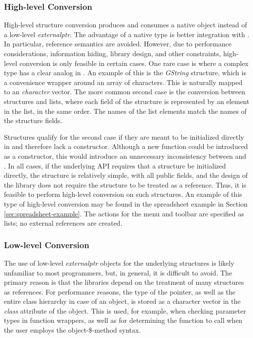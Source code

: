 \documentclass[article]{jss}
\begin{document}
\subsubsection[High-level Conversion]{High-level Conversion}\label{sec:high-level-conversion}

High-level structure conversion produces and consumes a native  object 
instead of a low-level \emph{externalptr}. The advantage of a native type is better
integration with . In particular, reference semantics are avoided.
However, due to performance considerations, information hiding, library design, 
and other constraints, high-level conversion is only feasible in certain cases.
One rare case is where a complex  type has a clear analog in .
An example of this is the \emph{GString} structure, which is a convenience
wrapper around an array of characters. This is naturally mapped to an 
\emph{character} vector. The more common second case is the conversion between
 structures and  lists, where each field of the structure
is represented by an element in the list, in the same order. The names of the 
list elements match the names of the structure fields.

Structures qualify for the second case if they are meant
to be initialized directly in  and therefore lack a constructor.
Although a new function could be introduced as a constructor, this would
introduce an unnecessary inconsistency between  and 
. In all cases, if the underlying API requires that a structure
be initialized directly, the structure is relatively simple, with all public 
fields, and the design of the library does not require the structure to be 
treated as a reference. Thus, it is feasible to perform high-level conversion
on such structures. An example of this type of high-level conversion may be 
found in the spreadsheet example in Section \ref{sec:spreadsheet-example}. The 
actions for the menu and toolbar are specified as lists; no external 
references are created. 

\subsubsection[Low-level Conversion]{Low-level Conversion}

The use of low-level \emph{externalptr} objects for the underlying 
structures is likely unfamiliar to most  programmers, but, in general,
it is difficult to avoid. The primary reason is that the  libraries
depend on the treatment of many structures as references. For performance 
reasons, the type of the pointer, as well as the entire
class hierarchy in case of an object, is stored as a character vector in the 
\emph{class} attribute of the  object. This is used, for example,
when checking parameter types in function wrappers, as well as for determining
the function to call when the user employs the object-\$-method syntax.
\end{document}
